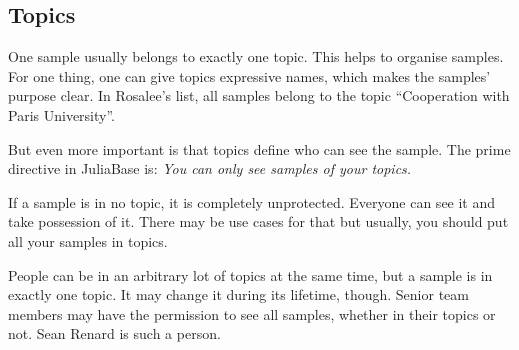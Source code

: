 \documentclass[a4paper,11pt,english]{sphinxmanual}
\begin{document}
\subsection{Topics}
\label{demo:topics}\label{demo:index-3}
One sample usually belongs to exactly one topic.  This helps to organise
samples.  For one thing, one can give topics expressive names, which makes the
samples' purpose clear.  In Rosalee's list, all samples belong to the topic
“Cooperation with Paris University”.

But even more important is that topics define who can see the sample.  The
prime directive in JuliaBase is: \emph{You can only see samples of your topics.}

If a sample is in no topic, it is completely unprotected.  Everyone can see it
and take possession of it.  There may be use cases for that but usually, you
should put all your samples in topics.

People can be in an arbitrary lot of topics at the same time, but a sample is
in exactly one topic.  It may change it during its lifetime, though.  Senior
team members may have the permission to see all samples, whether in their
topics or not.  Sean Renard is such a person.

\end{document}
